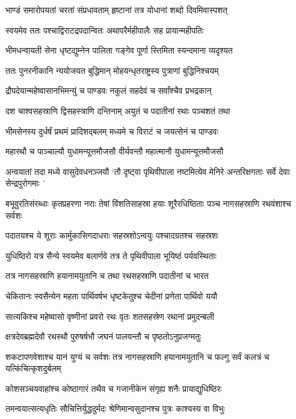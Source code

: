 \twolineshloka
{भाण्डं समारोपयतां चरतां संप्रधावताम्}
{हृष्टानां तत्र योधानां शब्दो दिवमिवास्पशत्}


\twolineshloka
{स्वयमेव ततः पश्चाद्विराटद्रपदान्वितः}
{अथापरैर्महीपालैः सह प्रायान्महीपतिः}


\twolineshloka
{भीमधन्वायती सेना धृष्टद्युम्नेन पालिता}
{गङ्गेव पूर्णा स्तिमिता स्यन्दमाना व्यदृश्यत}


\twolineshloka
{ततः पुनरनीकानि न्ययोजयत बुद्धिमान्}
{मोहयन्धृतराष्ट्रस्य पुत्राणां बुद्धिनिश्चयम्}


\twolineshloka
{द्रौपदेयान्महेष्वासानभिमन्युं च पाण्डवः}
{नकुलं सहदेवं च सर्वांश्चैव प्रभद्रकान्}


\twolineshloka
{दश चाश्वसहस्राणि द्विसहस्त्राणि दन्तिनाम्}
{अयुतं च पदातीनां रथाः पञ्चशतं तथा}


\twolineshloka
{भीमसेनस्य दुर्धर्षं प्रथमं प्रादिशद्बलम्}
{मध्यमे च विराटं च जयत्सेनं च पाण्डवः}


\twolineshloka
{महारथौ च पाञ्चाल्यौ युधामन्यूत्तमौजसौ}
{वीर्यवन्तौ महात्मानौ युधामन्यूत्तमौजसौ}


\threelineshloka
{अन्वयातां तदा मध्ये वासुदेवधनञ्जयौ}
{`तौ दृष्ट्वा पृथिवीपाला नष्टमित्येव मेनिरे}
{अन्तरिक्षगताः सर्वे देवाः सेन्द्रपुरोगमाः '}


\threelineshloka
{बभूवुरतिसंरब्धाः कृतप्रहरणा नराः}
{तेषां विंशतिसाहस्रा हयाः शूरैरधिष्ठिताः}
{पञ्च नागसहस्राणि रथवंशाश्च सर्वशः}


\twolineshloka
{पदातयश्च ये शूराः कार्मुकासिगदाधराः}
{सहस्रशोऽन्वयुः पश्चादग्रतश्च सहस्रशः}


\twolineshloka
{युधिष्ठिरो यत्र सैन्ये स्वयमेव बलार्णवे}
{तत्र ते पृथिवीपाला भूयिष्ठं पर्यवस्थिताः}


\twolineshloka
{तत्र नागसहस्राणि हयानामयुतानि च}
{तथा रथसहस्राणि पदातीनां च भारत}


\twolineshloka
{चेकितानः स्वसैन्येन महता पार्थिवर्षभ}
{धृष्टकेतुश्च चेदीनां प्रणेता पार्थिवो ययौ}


\twolineshloka
{सात्यकिश्च महेष्वासो वृष्णीनां प्रवरो रथः}
{वृतः शतसहस्रेण रथानां प्रमुदन्बली}


\twolineshloka
{क्षत्रदेवब्रह्मदेवौ रथस्थौ पुरुषर्षभौ}
{जघनं पालयन्तौ च पृष्ठतोऽनुप्रजग्मतुः}


\threelineshloka
{शकटापणवेशाश्च यानं युग्यं च सर्वशः}
{तत्र नागसहस्राणि हयानामयुतानि च}
{फल्गु सर्वं कलत्रं च यत्किंचित्कृशदुर्बलम्}


\twolineshloka
{कोशसञ्चयवाहांश्च कोष्ठागारं तथैव च}
{गजानीकेन संगृह्य शनैः प्रायाद्युधिष्ठिरः}


\twolineshloka
{तमन्वयात्सत्यधृतिः सौचित्तिर्युद्धदुर्मदः}
{श्रेणिमान्वसुदानश्च पुत्रः काश्यस्य वा विभुः}


